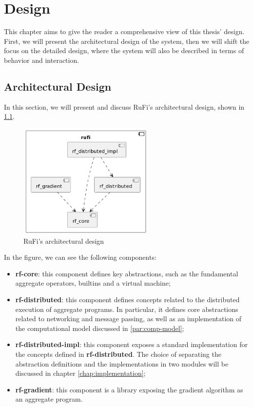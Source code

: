 
\chapter{Design}
\label{chap:design}
This chapter aims to give the reader a comprehensive view of this thesis' design. First, we will present the architectural design of the system, then we will shift the focus on
the detailed design, where the system will also be described in terms of behavior and interaction.

\section{Architectural Design}
\label{sec:architectural-design}
In this section, we will present and discuss RuFi's architectural design, shown in \cref{fig:rufi-architecture}.

\begin{figure}[ht!]
    \centering
    \includegraphics[width=0.6\textwidth]{figures/diagrams/img/rufi-architecture.png}
    \caption{RuFi's architectural design}
    \label{fig:rufi-architecture}
\end{figure}

In the figure, we can see the following components:

\begin{itemize}
    \item \textbf{rf-core}: this component defines key abstractions, such as the fundamental aggregate operators, builtins and a virtual machine;
    \item \textbf{rf-distributed}: this component defines concepts related to the distributed execution of aggregate programs.
          In particular, it defines core abstractions related to networking and message passing, as well as an implementation of the computational model discussed in \ref{par:comp-model};
    \item \textbf{rf-distributed-impl}: this component exposes a standard implementation for the concepts defined in \textbf{rf-distributed}.
          The choice of separating the abstraction definitions and the implementations in two modules will be discussed in chapter \ref{chap:implementation};
    \item \textbf{rf-gradient}: this component is a library exposing the gradient algorithm as an aggregate program.
\end{itemize}

